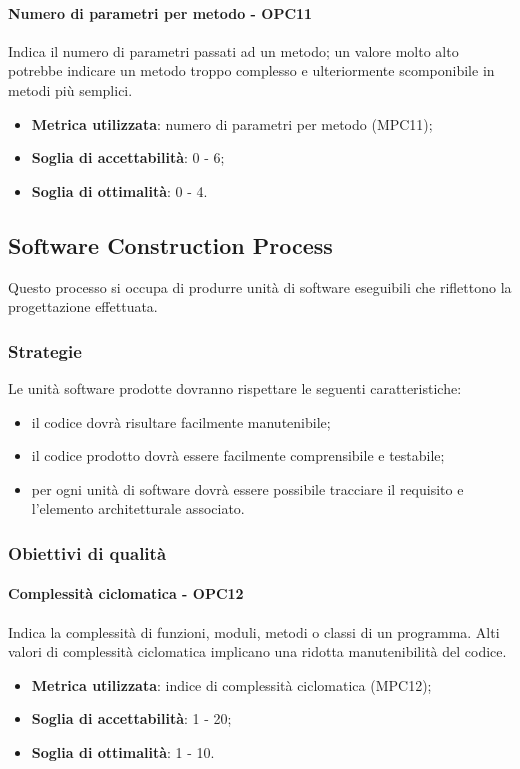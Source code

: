 \documentclass[PdQ.tex]{subfiles}
\begin{document}
			\paragraph{Numero di parametri per metodo - OPC11}
			Indica il numero di parametri passati ad un metodo; un valore molto alto potrebbe indicare un
			metodo troppo complesso e ulteriormente scomponibile in metodi più semplici.
			\begin{itemize}
				\item \textbf{Metrica utilizzata}: numero di parametri per metodo (MPC11);
				\item \textbf{Soglia di accettabilità}: 0 - 6;
				\item \textbf{Soglia di ottimalità}: 0 - 4.
			\end{itemize}

	\subsection{Software Construction Process}
		Questo processo si occupa di produrre unità di software eseguibili che riflettono la progettazione effettuata.

		\subsubsection{Strategie}
			Le unità software prodotte dovranno rispettare le seguenti caratteristiche:
			\begin{itemize}
				\item il codice dovrà risultare facilmente manutenibile;
				\item il codice prodotto dovrà essere facilmente comprensibile e testabile;
				\item per ogni unità di software dovrà essere possibile tracciare il requisito e l'elemento architetturale associato.
			\end{itemize}

		\subsubsection{Obiettivi di qualità}
			\paragraph{Complessità ciclomatica - OPC12}
				Indica la complessità di funzioni, moduli, metodi o classi di un programma. Alti valori di complessità ciclomatica implicano una ridotta
				manutenibilità del codice.
				\begin{itemize}
					\item \textbf{Metrica utilizzata}: indice di complessità ciclomatica (MPC12);
					\item \textbf{Soglia di accettabilità}: 1 - 20;
					\item \textbf{Soglia di ottimalità}: 1 - 10.
				\end{itemize}
\end{document}
